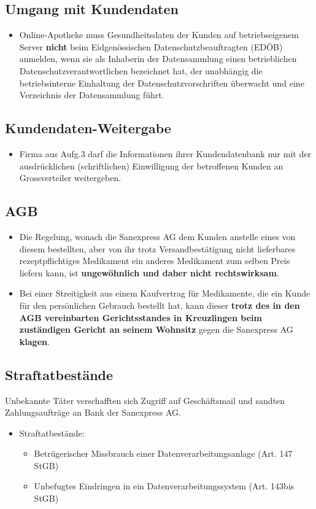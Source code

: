 \subsection{Umgang mit Kundendaten}
\begin{itemize}
	\item Online-Apotheke muss Gesundheitsdaten der Kunden auf betriebseigenem Server \textbf{nicht} beim Eidgenössischen Datenschutzbeauftragten (EDÖB) anmelden, wenn sie als Inhaberin der Datensammlung einen betrieblichen Datenschutzverantwortlichen bezeichnet hat, der unabhängig die betriebsinterne Einhaltung der Datenschutzvorschriften überwacht und eine Verzeichnis der Datensammlung führt.
\end{itemize}

\subsection{Kundendaten-Weitergabe}
\begin{itemize}
	\item Firma aus Aufg.3 darf die Informationen ihrer Kundendatenbank nur mit der ausdrücklichen (schriftlichen) Einwilligung der betroffenen Kunden an Grossverteiler weitergeben.
\end{itemize}

\subsection{AGB}
\begin{itemize}
	\item Die Regelung, wonach die Sanexpress AG dem Kunden anstelle eines von diesem bestellten, aber von ihr trotz Versandbestätigung nicht lieferbares rezeptpflichtiges Medikament ein anderes Medikament zum selben Preis liefern kann, ist \textbf{ungewöhnlich und daher nicht rechtswirksam}.
	\item Bei einer Streitigkeit aus einem Kaufvertrag für Medikamente, die ein Kunde für den persönlichen Gebrauch bestellt hat, kann dieser \textbf{trotz des in den AGB vereinbarten Gerichtsstandes in Kreuzlingen beim zuständigen Gericht an seinem Wohnsitz} gegen die Sanexpress AG \textbf{klagen}.
\end{itemize}

\subsection{Straftatbestände}
Unbekannte Täter verschafften sich Zugriff auf Geschäftsmail und sandten Zahlungsaufträge an Bank der Sanexpress AG.
\begin{itemize}
	\item Straftatbestände:
	\begin{itemize}
		\item Betrügerischer Missbrauch einer Datenverarbeitungsanlage (Art. 147 StGB)
		\item Unbefugtes Eindringen in ein Datenverarbeitungssystem (Art. 143bis StGB)
	\end{itemize}
\end{itemize}

